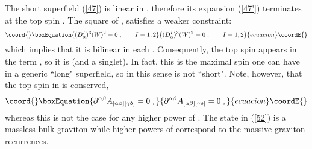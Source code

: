 \documentclass[a4paper,12pt]{article}
\begin{document}
 
The short superfield \coordHE{} (\ref{47}) is linear in \coordHE{}, 
therefore its expansion (\ref{47'}) terminates at the top spin 
\coordHE{}. The square of \coordHE{}, \coordHE{} satisfies a weaker 
constraint: 
\begin{equation}\coord{}\boxEquation{\label{51}
  (D^I_\alpha)^3(W)^2=0\;, \qquad I=1,2
}{(D^I_\alpha)^3(W)^2=0\;, \qquad I=1,2
}{ecuacion}\coordE{}\end{equation}
which implies that it is bilinear in each \coordHE{}. 
Consequently, the top spin appears in the term 
\coordHE{}, so it is \coordHE{} (and a 
\coordHE{} singlet). In fact, this is the maximal spin 
one can have in a generic \coordHE{} 
 ``long" superfield, so in this sense \coordHE{} is not ``short". Note, 
however, that the top spin in \coordHE{} is conserved, 
\begin{equation}\coord{}\boxEquation{\label{52}
 \partial^{\alpha\beta}  A_{[\alpha\beta][\gamma\delta]}=0\;,
}{\partial^{\alpha\beta}  A_{[\alpha\beta][\gamma\delta]}=0\;,
}{ecuacion}\coordE{}\end{equation}
whereas this is not the case for any higher power of \coordHE{}. The state in (\ref{52})
is a massless bulk graviton while higher powers of \coordHE{} correspond to the massive
graviton recurrences. 
\end{document}
